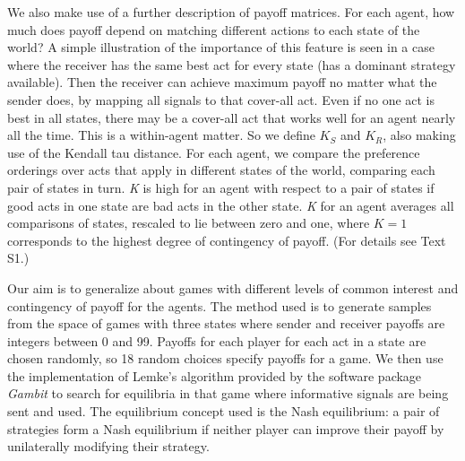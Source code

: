 \documentclass[10pt]{article}
\begin{document}
We also make use of a further description of payoff matrices. For each
agent, how much does payoff depend on matching different actions to each
state of the world? A simple illustration of the importance of this
feature is seen in a case where the receiver has the same best act for
every state (has a dominant strategy available). Then the receiver can
achieve maximum payoff no matter what the sender does, by mapping all
signals to that cover-all act. Even if no one act is best in all
states, there may be a cover-all act that works well for an agent nearly
all the time. This is a within-agent matter. So we define $K_S$ and
$K_R$, also making use of the Kendall tau distance. For each agent, we
compare the preference orderings over acts that apply in different
states of the world, comparing each pair of states in turn. \emph{K} is
high for an agent with respect to a pair of states if good acts in one
state are bad acts in the other state. \emph{K} for an agent averages
all comparisons of states, rescaled to lie between zero and one, where
$K=1$ corresponds to the highest degree of contingency of payoff. (For
details see Text S1.)

Our aim is to generalize about games with different levels of common
interest and contingency of payoff for the agents. The method used is to
generate samples from the space of games with three states where sender
and receiver payoffs are integers between 0 and 99. Payoffs for each
player for each act in a state are chosen randomly, so 18 random choices
specify payoffs for a game. We then use the implementation of Lemke's
\cite{Lemke1965} algorithm provided by the software package \emph{Gambit} \cite{McKelvey2010} to
search for equilibria in that game where informative signals are being
sent and used. The equilibrium concept used is the Nash equilibrium: a
pair of strategies form a Nash equilibrium if neither player can improve
their payoff by unilaterally modifying their strategy.
\end{document}
